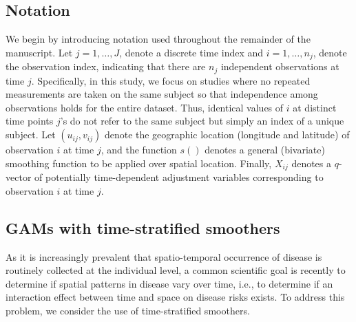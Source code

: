	\subsection{Notation}
	We begin by introducing notation used throughout the remainder of the manuscript. Let $j=1,\dots,J$, denote a discrete time index and $i=1,\dots,n_j$, denote the observation index, indicating that there are $n_j$ independent observations at time $j$. Specifically, in this study, we focus on studies where no repeated measurements are taken on the same subject so that independence among observations holds for the entire dataset. Thus, identical values of $i$ at distinct time points $j$'s do not refer to the same subject but simply an index of a unique subject. Let $(u_{ij},v_{ij})$ denote the geographic location (longitude and latitude) of observation $i$ at time $j$, and the function $s()$ denotes a general (bivariate) smoothing function to be applied over spatial location. Finally, $X_{ij}$ denotes a $q$-vector of potentially time-dependent adjustment variables corresponding to observation $i$ at time $j$. 
	
	\subsection{GAMs with time-stratified smoothers}
	
	As it is increasingly prevalent that spatio-temporal occurrence of disease is routinely collected at the individual level, a common scientific goal is recently to determine if spatial patterns in disease vary over time, i.e., to determine if an interaction effect between time and space on disease risks exists. To address this problem, we consider the use of time-stratified smoothers.
	
